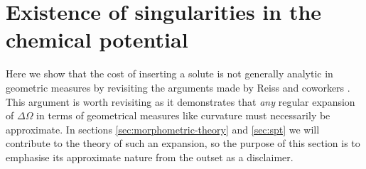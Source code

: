 \documentclass[11pt,twoside]{report}
\begin{document}
\chapter{Existence of singularities in the chemical potential}
\label{appendix:spt-singularities}

Here we show that the cost of inserting a solute is not generally analytic in geometric measures by revisiting the arguments made by Reiss and coworkers \cite{ReissJCP1959,ReissJCP1960}.
This argument is worth revisiting as it demonstrates that \emph{any} regular expansion of $\Delta \Omega$ in terms of geometrical measures like curvature must necessarily be approximate.
In sections \ref{sec:morphometric-theory} and \ref{sec:spt} we will contribute to the theory of such an expansion, so the purpose of this section is to emphasise its approximate nature from the outset as a disclaimer.
\end{document}
